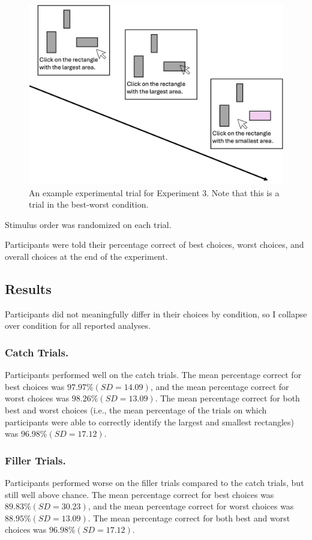 \begin{figure}
   \includegraphics[width=\linewidth]{figures/bw_design_fig.jpg}
   \caption{An example experimental trial for Experiment 3. Note that this is a trial in the best-worst condition.}
   \label{fig:bw_example_trial}
 \end{figure}
 

Stimulus order was randomized on each trial. 

Participants were told their percentage correct of best choices, worst choices, and overall choices at the end of the experiment.

\subsection{Results}

Participants did not meaningfully differ in their choices by condition, so I collapse over condition for all reported analyses.

\subsubsection{Catch Trials.}
Participants performed well on the catch trials. The mean percentage correct for best choices was $97.97\% (SD=14.09)$, and the mean percentage correct for worst choices was $98.26\% (SD=13.09)$. The mean percentage correct for both best and worst choices (i.e., the mean percentage of the trials on which participants were able to correctly identify the largest and smallest rectangles) was $96.98\% (SD=17.12)$. 

\subsubsection{Filler Trials.}
Participants performed worse on the filler trials compared to the catch trials, but still well above chance. The mean percentage correct for best choices was $89.83\% (SD=30.23)$, and the mean percentage correct for worst choices was $88.95\% (SD=13.09)$. The mean percentage correct for both best and worst choices was $96.98\% (SD=17.12)$. 

